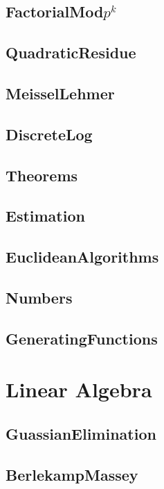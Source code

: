 	\subsection{FactorialMod$p^k$}
	
	\subsection{QuadraticResidue}
	
	\subsection{MeisselLehmer}
	
	\subsection{DiscreteLog}
	
	\subsection{Theorems}
	
	\subsection{Estimation}
	
	\subsection{EuclideanAlgorithms}
	
	\subsection{Numbers}
	
	\subsection{GeneratingFunctions}
	
\section{Linear Algebra}
	\subsection{GuassianElimination}
	
	\subsection{BerlekampMassey}
	
